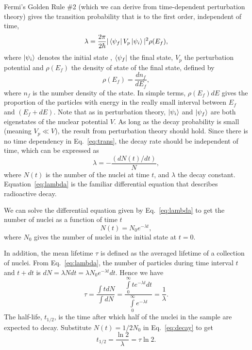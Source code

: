 \documentclass[nofootinbib,preprint,aps]{revtex4-1}
\begin{document}
        Fermi's Golden Rule \#2 (which we can derive from time-dependent
        perturbation theory)
        gives the transition probability that is to the first order, independent of time,
        \begin{equation}
            \label{eq:trans}
            \lambda = \frac{2\pi}{2\hbar}|\bra{\psi_f}V_p\ket{\psi_i}|^2\rho(E_f),
        \end{equation}
        where $\ket{\psi_i}$ denotes the initial state , $\bra{\psi_f}$ the final state, $V_p$ the perturbation
        potential and $\rho(E_f)$ the density of state of the final state, defined by
        \begin{equation}
            \rho(E_f) = \frac{dn_f}{dE_f},
        \end{equation}
        where $n_f$ is the number density of the state.\cite[chapt. 6]{k88}
        In simple terms, $\rho(E_f)dE$ gives the proportion of the particles with energy in the
        really small interval between
        $E_f$ and $(E_f+dE)$.
        Note that as in perturbation theory, $\ket{\psi_i}$ and
        $\ket{\psi_f}$ are both eigenstates of the nuclear potential $V$. As long as
        the decay probability is small (meaning $V_p\ll V$), the result from perturbation theory should hold. Since
        there is no time dependency in Eq.~\ref{eq:trans}, the
        decay rate should be independent of time, which can be expressed as
        \begin{equation}
            \label{eq:lambda}
            \lambda = -\frac{(dN(t)/dt)}{N},
        \end{equation}
        where $N(t)$ is the number of the nuclei at time $t$, and $\lambda$ the decay constant.
        Equation~\ref{eq:lambda} is the familiar differential equation that describes radioactive decay.
        
        We can solve the differential equation given by Eq.~\ref{eq:lambda} to get
        the number of nuclei as a function of time $t$
        \begin{equation}
            \label{eq:decay}
            N(t) = N_0 e^{-\lambda t},
        \end{equation}
        where $N_0$ gives the number of nuclei in the initial state at $t=0$.

        In addition, the mean lifetime $\tau$ is defined as the averaged lifetime of a collection of nuclei.
        From Eq.~\ref{eq:lambda}, the number of particles during time interval $t$ and $t+dt$ is $dN=\lambda N dt=\lambda
        N_0 e^{-\lambda t}dt$. Hence we have
        \begin{equation}
            \tau = \frac{\int t dN}{\int dN}=\frac{\int\limits_0^{\infty}t e^{-\lambda t}dt}
            {\int\limits_0^{\infty}e^{-\lambda t}} = \frac{1}{\lambda}.
        \end{equation}
        The half-life, $t_{1/2}$, is the time after which half of the nuclei in the sample are expected to
        decay. Substitute $N(t)=1/2N_0$ in Eq.~\ref{eq:decay} to get
        \begin{equation}
            t_{1/2} = \frac{\ln 2}{\lambda}=\tau \ln 2.
        \end{equation}
\end{document}
